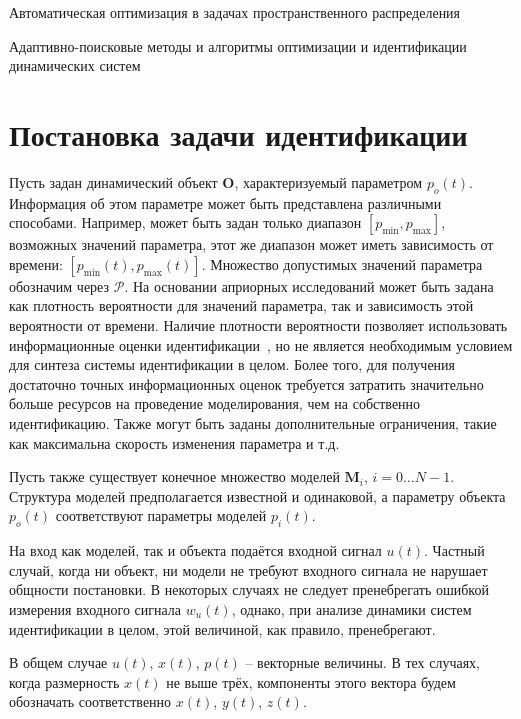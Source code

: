 Автоматическая оптимизация в задачах пространственного распределения~\cite{auto_optim_intask}

Адаптивно-поисковые методы и алгоритмы оптимизации и идентификации динамических систем~\cite{mich_92}



\section{Постановка задачи идентификации}  %

Пусть задан динамический объект $ \mathbf{O}$, характеризуемый параметром $p_o(t)$.
Информация об этом параметре может быть представлена
различными способами. Например, может быть задан только диапазон
$[p_{\min}, p_{\max}]$,
возможных значений параметра,
этот же диапазон может иметь зависимость от времени:
$[p_{\min}(t), p_{\max}(t)]$.
Множество допустимых значений параметра обозначим через $\mathcal{P}$.
На основании априорных исследований может
быть задана как плотность вероятности для значений параметра,
так и зависимость этой вероятности от времени. Наличие плотности вероятности
позволяет использовать информационные оценки идентификации~\cite{info_cipkin,atu_asau10},
но не является необходимым условием для синтеза системы идентификации в целом.
Более того, для получения достаточно точных информационных оценок
требуется затратить значительно больше ресурсов на проведение моделирования,
чем на собственно идентификацию.
Также могут быть заданы дополнительные ограничения, такие как максимальна скорость
изменения параметра и т.д.

Пусть также существует конечное множество моделей
\label{atu:d:N}$\mathbf{M}_i$, $i=0 \ldots N-1$.
Структура моделей предполагается известной и одинаковой,
а параметру объекта $p_o(t)$ соответствуют параметры моделей $p_{i}(t)$.

На вход как моделей, так и объекта подаётся входной сигнал \label{atu:d:u}$u(t)$.
Частный случай, когда ни объект, ни модели не требуют входного сигнала
не нарушает общности постановки. В некоторых случаях
не следует пренебрегать ошибкой измерения входного сигнала $w_u(t)$,
однако, при анализе динамики систем идентификации в целом,
этой величиной, как правило, пренебрегают.

В общем случае $u(t)$, $x(t)$, $p(t)$ -- векторные величины.
В тех случаях, когда размерность $x(t)$ не выше трёх,
компоненты этого вектора будем обозначать соответственно $x(t)$, $y(t)$, $z(t)$.

